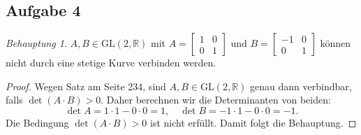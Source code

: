 \documentclass[fleqn,draft,a5paper,12pt]{article}
\theoremstyle{remark}
\newtheorem*{Behauptung}{Behauptung}
\begin{document}
\subsection{Aufgabe 4}
\begin{Behauptung}
  \(A, B \in \mathrm{GL}(2, \mathbb{R})\) mit \(A =
  \begin{bmatrix}
    1 & 0 \\ 0 & 1
  \end{bmatrix}
  \)
  und
  \(B =
  \begin{bmatrix}
    -1 & 0 \\ 0 & 1
  \end{bmatrix}
  \)
  können nicht durch eine stetige Kurve verbinden werden.
\end{Behauptung}
\begin{proof}
  Wegen Satz am Seite 234, sind \(A, B \in \mathrm{GL}(2, \mathbb{R})\) genau dann
  verbindbar, falls \(\det (A \cdot B) >0\).  Daher berechnen wir die
  Determinanten von beiden:
  \[\det A = 1 \cdot 1 - 0 \cdot 0 = 1, \quad \det B = -1 \cdot 1 - 0 \cdot 0 = -1.\]
  Die Bedingung \(\det (A \cdot B) > 0 \) ist nicht erfüllt.  Damit folgt
  die Behauptung.
\end{proof}
\end{document}
